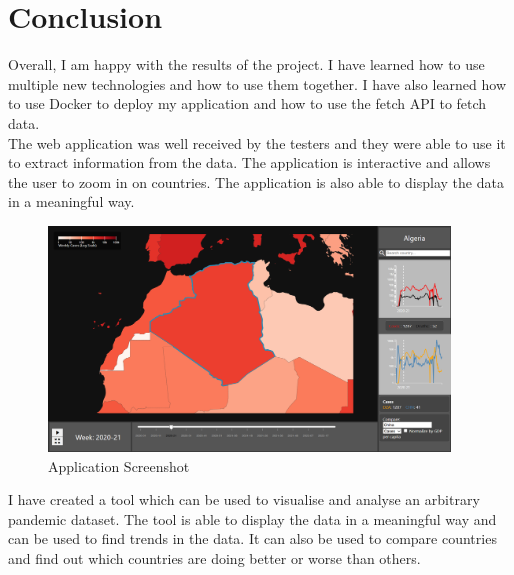 \documentclass{report}
\begin{document}
\newpage

\chapter{Conclusion}
Overall, I am happy with the results of the project. I have learned how to use multiple new technologies and how to use them together. I have also learned how to use Docker to deploy my application and how to use the fetch API to fetch data.\\

The web application was well received by the testers and they were able to use it to extract information from the data. The application is interactive and allows the user to zoom in on countries. The application is also able to display the data in a meaningful way.

\begin{center}
    \begin{figure}[h]
        \centering
        \includegraphics[width=0.95\textwidth]{Images/dashboard.png}
        \caption{Application Screenshot}
        \label{fig:dashboard-conc}
    \end{figure}
\end{center}
I have created a tool which can be used to visualise and analyse an arbitrary pandemic dataset. The tool is able to display the data in a meaningful way and can be used to find trends in the data. It can also be used to compare countries and find out which countries are doing better or worse than others.\\
\newpage
\end{document}
